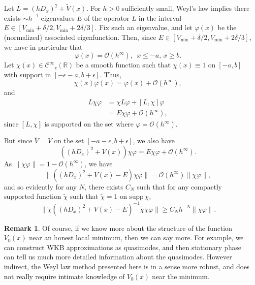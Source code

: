 \documentclass[twoside, final]{amsart}
\theoremstyle{definition}
\newtheorem{remark}[proposition]{Remark}
\numberwithin{equation}{section}
\begin{document}
Let $L = (hD_x)^2 + {\widetilde{V}}(x)$.  
For $h>0$
sufficiently small, Weyl's law implies there exists $\sim h^{-1}$
eigenvalues $E$ of the operator $L$ in the interval $E \in [{V_{\text{min}}}
+\delta/2, {V_{\text{min}}} + 
2 \delta/3]$.  Fix such an eigenvalue, and let ${\varphi}(x)$ be the
(normalized) 
associated eigenfunction.  Then, since $E \in [{V_{\text{min}}}
+\delta/2, {V_{\text{min}}}
+
2 \delta/3]$, we have in particular that 
\[
{\varphi}(x) = {{\mathcal O}}(h^\infty), \,\,\, x {\leqslant} -a, \, x {\geqslant} b.
\]
Let $\chi(x) \in {{\mathcal C}^\infty}_c( {{\mathbb R}})$ be a smooth function such that
$\chi(x) \equiv 1$ on $[-a,b]$ with support in $[-\epsilon - a, b +
\epsilon]$.  Thus,
\[
\chi(x) {\varphi}(x) = {\varphi}(x) + {{\mathcal O}}(h^\infty),
\]
and
\begin{align*}
L \chi {\varphi} & = \chi L {\varphi} + [L, \chi] {\varphi} \\
& = E \chi {\varphi} + {{\mathcal O}}(h^\infty),
\end{align*}
since $[L, \chi]$ is supported on the set where ${\varphi} =
{{\mathcal O}}(h^\infty)$.  

But since ${\widetilde{V}} = V$ on the set $[-a-\epsilon, b + \epsilon]$, we also
have
\[
((hD_x)^2 + V(x) ) \chi {\varphi} = E \chi {\varphi} + {{\mathcal O}}(h^\infty).
\]
As $\| \chi {\varphi} \| = 1 - {{\mathcal O}}(h^\infty)$, we have 
\[
\| ((hD_x)^2 + V(x) -E ) \chi {\varphi} \|  = {{\mathcal O}}(h^\infty) \| \chi {\varphi} \|,
\]
and so evidently for any $N$, there exists $C_N$ such that for any
compactly supported function ${\tilde{\chi}}$ such that ${\tilde{\chi}} = 1$ on ${\mathrm{supp}\,}
\chi$,
\begin{equation}
\label{E:stable-qm}
\| {\tilde{\chi}} ((hD_x)^2 + V(x) -E)^{-1} {\tilde{\chi}} \chi {\varphi} \| {\geqslant} C_N h^{-N}
\| \chi {\varphi} \|.
\end{equation}

\begin{remark}
Of course, if we know more about the structure of the function
$V_0(x)$ near an honest local minimum, then we can say more.  For
example, we can construct WKB approximations as quasimodes, and then
stationary phase can tell us much more detailed information about the quasimodes.  However
indirect, the Weyl law method presented here is in a sense more
robust, and does not really require intimate knowledge of $V_0(x)$
near the minimum.  

\end{remark}
\end{document}
